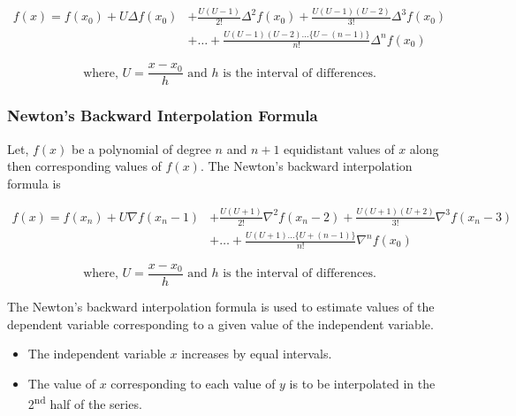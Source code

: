 \documentclass[10pt, twoside, a4paper]{article}
\begin{document}
\begin{tcolorbox}
\begin{align*}
  f(x)=f(x_0)+U\Delta f(x_0) &+ \frac{U(U-1)}{2!}\Delta^2f(x_0)
       +\frac{U(U-1)(U-2)}{3!}\Delta^3f(x_0)\\
                             &+ \dots+\frac{U(U-1)(U-2)\dots\{U-(n-1)\}}{n!}
                                \Delta^nf(x_0)
\end{align*}
\end{tcolorbox}

\begin{equation*}
  \text{where, } U = \frac{x-x_0}{h} \text{ and } h \text{ is the interval of
  differences.}
\end{equation*}

\subsubsection{Newton's Backward Interpolation Formula}%
Let, $f(x)$ be a polynomial of degree $n$ and $n+1$ equidistant values of $x$ 
along then corresponding values of $f(x)$. The Newton's backward interpolation
formula is

\begin{tcolorbox}
\begin{align*}
  f(x) = f(x_n)+U\nabla f(x_n-1) &+ \frac{U(U+1)}{2!}\nabla^2f(x_n-2)
  +\frac{U(U+1)(U+2)}{3!}\nabla^3f(x_n-3)\\
                                 &+ \dots+\frac{U(U+1)\dots\{U+(n-1)\}}{n!}
                                 \nabla^nf(x_0)
\end{align*}
\end{tcolorbox}

\begin{equation*}
  \text{where, } U = \frac{x-x_0}{h} \text{ and } h \text{ is the interval of
  differences.}
\end{equation*}

The Newton's backward interpolation formula is used to estimate values of the 
dependent variable corresponding to a given value of the independent variable.

\begin{itemize}
  \item The independent variable $x$ increases by equal intervals.
  \item The value of $x$ corresponding to each value of $y$ is to be
    interpolated in the 2\textsuperscript{nd} half of the series.
\end{itemize}
\end{document}
